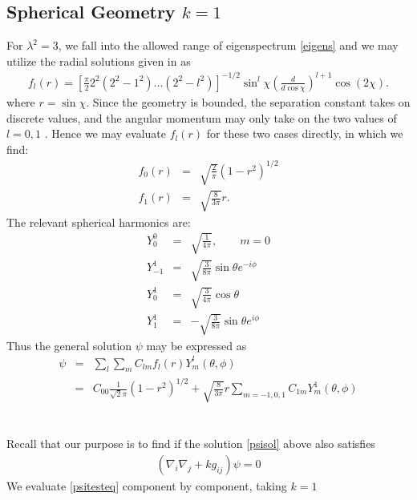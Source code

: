 \documentclass[10pt,letterpaper]{article}
\numberwithin{equation}{section}
\begin{document}
\subsection{Spherical Geometry $k=1$}
For $\lambda^2 = 3$, we fall into the allowed range of eigenspectrum \eqref{eigens} and we may utilize the radial solutions given in \cite{mannheim1988energy} as
\begin{eqnarray}
f_l(r) = \left[ \frac{\pi}{2}2^2(2^2-1^2)...(2^2-l^2)\right]^{-1/2}\sin^l\chi\left(\frac{d}{d\cos\chi}\right)^{l+1}\cos( 2\chi).
\end{eqnarray}
where $r=\sin\chi$. Since the geometry is bounded, the separation constant takes on discrete values, and the angular momentum may only take on the two values of $l=0,1$ \cite{mannheimgrg}. Hence we may evaluate $f_l(r)$ for these two cases directly, in which we find:
\begin{eqnarray}
f_0(r)&=& \sqrt{\frac{2}{\pi}} (1-r^2)^{1/2}
\nonumber\\
f_1(r) &=& \sqrt{\frac{8}{3\pi}}r.
\end{eqnarray}
The relevant spherical harmonics are:
\begin{eqnarray}
Y^0_0 &=& \sqrt{\frac{1}{4\pi}},\qquad m=0
\nonumber\\
Y^1_{-1} &=& \sqrt{\frac{3}{8\pi}} \sin\theta e^{-i\phi} 
\nonumber\\
Y^1_0 &=& \sqrt{\frac{3}{4\pi}}\cos\theta
\nonumber\\
Y^1_1 &=& -\sqrt{\frac{3}{8\pi}} \sin\theta e^{i\phi} 
\end{eqnarray}
Thus the general solution $\psi$ may be expressed as
\begin{eqnarray}
\psi &=&  \sum_{l}\sum_m C_{lm}f_l(r)Y^l_m(\theta,\phi)
\nonumber\\
&=& C_{00}\frac{1}{\sqrt 2 \pi}(1-r^2)^{1/2} + \sqrt{\frac{8}{3\pi}} r \sum_{m=-1,0,1} C_{1m}  Y^1_m(\theta,\phi)
\label{psisol}
\end{eqnarray}
\\ \\
Recall that our purpose is to find if the solution \eqref{psisol} above also satisfies
\begin{eqnarray}
(\nabla_i\nabla_j +k g_{ij})\psi=0
\label{psitesteq}
\end{eqnarray}
We evaluate \eqref{psitesteq} component by component, taking $k=1$
\end{document}
